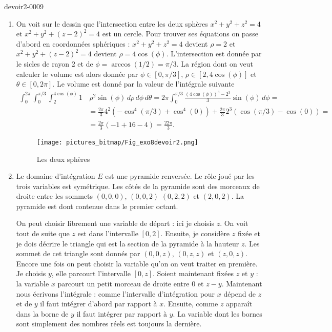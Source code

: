 \begin{corrige}{devoir2-0009}
  \begin{enumerate}
  \item On voit sur le dessin que l'intersection entre les deux sphères $x^2+y^2+z^2=4$ et $x^2+y^2+(z-2)^2=4$ est un cercle. Pour trouver ses équations on passe d'abord en coordonnées sphériques :  $x^2+y^2+z^2=4$ devient $\rho=2$ et $x^2+y^2+(z-2)^2=4$ devient $\rho= 4\cos(\phi)$. L'intersection est donnée par le sicles de rayon $2$ et de $\phi= \arccos(1/2)= \pi/3$. La région dont on veut calculer le volume est alors donnée par $\phi\in[0, \pi/3]$, $\rho\in[2, 4\cos(\phi)] $ et $\theta \in [0, 2\pi]$. Le volume est donné par la valeur de l'intégrale suivante
    \begin{equation}
      \begin{aligned}
        \int_0^{2\pi}\int_0^{\pi/3}\int_2^{4\cos(\phi)}1 & \, \rho^2\sin(\phi)\, d\rho \, d\phi \, d\theta = 2\pi \int_0^{\pi/3}\frac{(4\cos(\phi))^3-2^3}{3} \sin(\phi)\, d\phi= \\
&= \frac{2\pi}{3}4^2\left( -\cos^4(\pi/3)+\cos^4(0)\right)+ \frac{2\pi}{3}2^3 \left( \cos(\pi/3)-\cos(0)\right)=\\
&=\frac{2\pi}{3}(-1+16 - 4) = \frac{22\pi}{3}.
      \end{aligned}
    \end{equation}

    \begin{figure}
      \begin{center}
        \texttt{[image: pictures\_bitmap/Fig\_exo8devoir2.png]}  
        \caption{Les deux sphères}\label{exo8devoir2}
      \end{center}
    \end{figure}
   
  \item Le domaine d'intégration $E$ est une pyramide renversée. Le rôle joué par les trois variables est symétrique. Les côtés de la pyramide sont des morceaux de droite entre les sommets $(0,0,0)$, $(0,0,2)$ $(0, 2, 2)$ et $(2, 0, 2)$. La pyramide est dont contenue dans le premier octant. 
 
On peut choisir librement  une variable de départ : ici je choisis $z$. On voit tout de suite que $z$ est dans l'intervalle $[0, 2]$. Ensuite, je considère $z$ fixée et je dois décrire le triangle qui est la section de la pyramide à la hauteur $z$. Les sommet de cet triangle sont donnés par $(0,0,z)$, $(0,z,z)$ et $(z,0,z)$. Encore une fois on peut choisir la variable qu'on on veut traiter en première. Je choisis $y$, elle parcourt l'intervalle $[0, z]$. Soient maintenant fixées $z$ et $y$ : la variable $x$ parcourt un petit morceau de droite entre $0$ et $z-y$. Maintenant nous écrivons l'intégrale : comme l'intervalle d'intégration pour $x$ dépend de $z$ et de $y$ il faut intégrer d'abord par rapport à $x$. Ensuite, comme $z$ apparaît dans la borne de $y$ il faut intégrer par rapport à $y$. La variable dont les bornes sont simplement des nombres réels est toujours la dernière.  


\end{enumerate}
\end{corrige}
